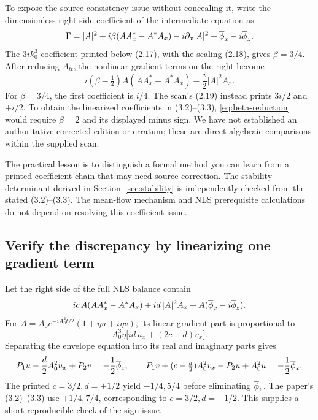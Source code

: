 To expose the source-consistency issue without concealing it, write the
dimensionless right-side coefficient of the intermediate equation as
\[
 \Gamma=|A|^2+i\beta(AA_x^*-A^*A_x)
              -i\partial_x|A|^2+\overline{\phi}_x-i\overline{\phi}_z.
\]
The $3ik_0^3$ coefficient printed below (2.17), with the scaling (2.18),
gives $\beta=3/4$. After reducing $A_{tt}$, the nonlinear gradient terms
on the right become
\begin{equation}\label{eq:beta-reduction}
 i(\beta-\tfrac12)A(AA_x^*-A^*A_x)
 -\frac i2|A|^2A_x.
\end{equation}
For $\beta=3/4$, the first coefficient is $i/4$.
The scan's (2.19) instead prints $3i/2$ and $+i/2$.
To obtain the linearized coefficients in (3.2)--(3.3),
\eqref{eq:beta-reduction} would require $\beta=2$ and its displayed minus
sign. We have not established an authoritative corrected edition or erratum;
these are direct algebraic comparisons within the supplied scan.

The practical lesson is to distinguish a formal method you can learn from
a printed coefficient chain that may need source correction. The stability
determinant derived in Section~\ref{sec:stability} is independently checked
from the stated (3.2)--(3.3). The mean-flow mechanism and NLS prerequisite
calculations do not depend on resolving this coefficient issue.

\subsection{Verify the discrepancy by linearizing one gradient term}
Let the right side of the full NLS balance contain
\[
 ic\,A(AA_x^*-A^*A_x)+id\,|A|^2A_x+A(\overline{\phi}_x-i\overline{\phi}_z).
\]
For $A=A_0e^{-iA_0^2t/2}(1+\eta u+i\eta v)$, its linear gradient part
is proportional to
\[
 A_0^3\eta\bigl[id\,u_x+(2c-d)v_x\bigr].
\]
Separating the envelope equation into its real and imaginary parts gives
\[
 P_1u-\frac d2A_0^2u_x+P_2v=-\frac12\overline{\phi}_z,
 \qquad
 P_1v+(c-\tfrac d2)A_0^2v_x-P_2u+A_0^2u=-\frac12\overline{\phi}_x.
\]
The printed $c=3/2,d=+1/2$ yield $-1/4,5/4$ before eliminating
$\overline{\phi}_z$. The paper's (3.2)--(3.3) use $+1/4,7/4$, corresponding to
$c=3/2,d=-1/2$. This supplies a short reproducible check of the sign issue.
\clearpage
